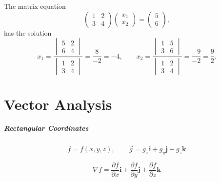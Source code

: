   The matrix equation
  \[ \begin{pmatrix}
    1       &       2 \\
    3       &       4 
  \end{pmatrix}
  \begin{pmatrix}
    x_1 \\
    x_2
  \end{pmatrix}
  = 
  \begin{pmatrix}
    5 \\
    6
  \end{pmatrix},
  \]
  has the solution
  \[ x_1 = \frac{
    \begin{vmatrix}
      5       &       2 \\
      6       &       4
    \end{vmatrix} }{
    \begin{vmatrix}
      1       &       2 \\
      3       &       4
    \end{vmatrix} }
  = \frac{8}{-2} = -4, \qquad
  x_2 = \frac{
    \begin{vmatrix}
      1       &       5 \\
      3       &       6
    \end{vmatrix} }{
    \begin{vmatrix}
      1       &       2 \\
      3       &       4
    \end{vmatrix} }
  = \frac{-9}{-2} = \frac{9}{2}.
  \]













\raggedbottom
\chapter{Vector Analysis}
\flushbottom

\paragraph{Rectangular Coordinates}

\[
f = f(x,y,z), \qquad \vec{g} = g_x \mathbf{i} + g_y \mathbf{j} + g_z \mathbf{k}
\]

\[
\nabla f = \frac{\partial f}{\partial x} \mathbf{i} + \frac{\partial f}{\partial y} \mathbf{j} + \frac{\partial f}{\partial z} \mathbf{k}
\]

